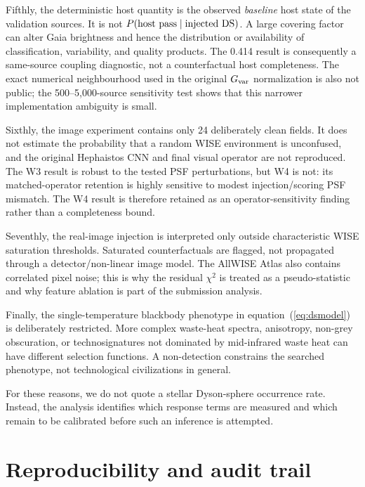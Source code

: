 \documentclass[fleqn,usenatbib]{mnras}
\begin{document}
Fifthly, the deterministic host quantity is the observed \emph{baseline} host state of the validation sources. It is not $P({\rm host\ pass}\mid{\rm injected\ DS})$. A large covering factor can alter Gaia brightness and hence the distribution or availability of classification, variability, and quality products. The 0.414 result is consequently a same-source coupling diagnostic, not a counterfactual host completeness. The exact numerical neighbourhood used in the original $G_{\rm var}$ normalization is also not public; the 500--5,000-source sensitivity test shows that this narrower implementation ambiguity is small.

Sixthly, the image experiment contains only 24 deliberately clean fields. It does not estimate the probability that a random WISE environment is unconfused, and the original Hephaistos CNN and final visual operator are not reproduced. The W3 result is robust to the tested PSF perturbations, but W4 is not: its matched-operator retention is highly sensitive to modest injection/scoring PSF mismatch. The W4 result is therefore retained as an operator-sensitivity finding rather than a completeness bound.

Seventhly, the real-image injection is interpreted only outside characteristic WISE saturation thresholds. Saturated counterfactuals are flagged, not propagated through a detector/non-linear image model. The AllWISE Atlas also contains correlated pixel noise; this is why the residual $\chi^2$ is treated as a pseudo-statistic and why feature ablation is part of the submission analysis.

Finally, the single-temperature blackbody phenotype in equation~(\ref{eq:dsmodel}) is deliberately restricted. More complex waste-heat spectra, anisotropy, non-grey obscuration, or technosignatures not dominated by mid-infrared waste heat can have different selection functions. A non-detection constrains the searched phenotype, not technological civilizations in general.

For these reasons, we do not quote a stellar Dyson-sphere occurrence rate. Instead, the analysis identifies which response terms are measured and which remain to be calibrated before such an inference is attempted.

\section{Reproducibility and audit trail}
\label{sec:repro}
\end{document}
